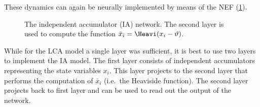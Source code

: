 These dynamics can again be neurally implemented by means of the NEF (\cref{fig:ia}).
\begin{figure}
    \begin{captionbeside}{The independent accumulator (IA) network. The second layer is used to compute the function $\bar{x}_i = \Heavi(x_i - \vartheta)$.\label{fig:ia}}
    \end{captionbeside}
\end{figure}
While for the LCA model a single layer was sufficient, it is best to use two layers to implement the IA model.
The first layer consists of independent accumulators representing the state variables $x_i$.
This layer projects to the second layer that performs the computation of $\bar{x}_i$ (i.e.\ the Heaviside function).
The second layer projects back to first layer and can be used to read out the output of the network.

